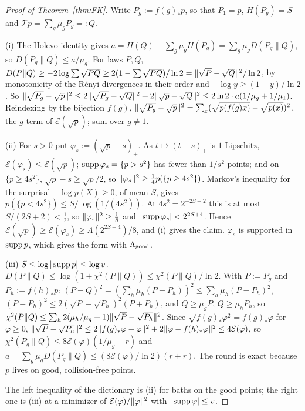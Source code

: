 \begin{proof}[Proof of Theorem~\ref{thm:FK}]
Write $P_g:=f(g)_*p$, so that $P_1=p$, $H(P_g)=S$ and $\mathcal Tp=\sum_g\mu_gP_g=:Q$.

(i) The Holevo identity gives $a=H(Q)-\sum_g\mu_gH(P_g)=\sum_g\mu_gD(P_g\|Q)$, so $D(P_g\|Q)\le a/\mu_g$. For laws $P,Q$,
$D(P\|Q)\ge-2\log\sum\sqrt{PQ}\ge2(1-\sum\sqrt{PQ})/\ln2=\lVert \sqrt P-\sqrt Q\rVert^2/\ln2$, by monotonicity of the R\'enyi divergences in their order and $-\log y\ge(1-y)/\ln2$. So
$\lVert \sqrt{P_g}-\sqrt p\rVert^2\le2\lVert \sqrt{P_g}-\sqrt Q\rVert^2+2\lVert \sqrt p-\sqrt Q\rVert^2\le2\ln2\cdot a(1/\mu_g+1/\mu_1)$. Reindexing by the bijection $f(g)$,
$\lVert \sqrt{P_g}-\sqrt p\rVert^2=\sum_x(\sqrt{p(f(g)x)}-\sqrt{p(x)})^2$, the $g$-term of $\mathcal E(\sqrt p)$; sum over $g\ne1$.

(ii) For $s>0$ put $\varphi_s:=(\sqrt p-s)_+$. As $t\mapsto(t-s)_+$ is $1$-Lipschitz, $\mathcal E(\varphi_s)\le\mathcal E(\sqrt p)$; $\operatorname{supp}\varphi_s=\{p>s^2\}$ has fewer than $1/s^2$ points;
and on $\{p\ge4s^2\}$, $\sqrt p-s\ge\sqrt p/2$, so $\lVert \varphi_s\rVert^2\ge\frac14p(\{p\ge4s^2\})$. Markov's inequality for the surprisal $-\log p(X)\ge0$, of mean $S$, gives
$p(\{p<4s^2\})\le S/\log(1/(4s^2))$. At $4s^2=2^{-2S-2}$ this is at most $S/(2S+2)<\frac12$, so $\lVert \varphi_s\rVert^2\ge\frac18$ and $|\operatorname{supp}\varphi_s|<2^{2S+4}$. Hence
$\mathcal E(\sqrt p)\ge\mathcal E(\varphi_s)\ge\Lambda(2^{2S+4})/8$, and (i) gives the claim. $\varphi_s$ is supported in $\operatorname{supp} p$, which gives the form with $\Lambda_{\rm good}$.

(iii) $S\le\log|\operatorname{supp} p|\le\log v$. $D(P\|Q)\le\log(1+\chi^2(P\|Q))\le\chi^2(P\|Q)/\ln2$. With $P:=P_g$ and $P_h:=f(h)_*p$: $(P-Q)^2=(\sum_h\mu_h(P-P_h))^2\le\sum_h\mu_h(P-P_h)^2$,
$(P-P_h)^2\le2(\sqrt P-\sqrt{P_h})^2(P+P_h)$, and $Q\ge\mu_gP$, $Q\ge\mu_hP_h$, so $\chi^2(P\|Q)\le\sum_h2(\mu_h/\mu_g+1)\lVert \sqrt P-\sqrt{P_h}\rVert^2$. Since
$\sqrt{f(g)_*\varphi^2}=f(g)_*\varphi$ for $\varphi\ge0$, $\lVert \sqrt P-\sqrt{P_h}\rVert^2\le2\lVert f(g)_*\varphi-\varphi\rVert^2+2\lVert \varphi-f(h)_*\varphi\rVert^2\le4\mathcal E(\varphi)$, so
$\chi^2(P_g\|Q)\le8\mathcal E(\varphi)(1/\mu_g+r)$ and $a=\sum_g\mu_gD(P_g\|Q)\le(8\mathcal E(\varphi)/\ln2)(r+r)$. The round is exact because $p$ lives on good, collision-free points.

The left inequality of the dictionary is (ii) for baths on the good points; the right one is (iii) at a minimizer of $\mathcal E(\varphi)/\lVert \varphi\rVert^2$ with $|\operatorname{supp}\varphi|\le v$.
\end{proof}

